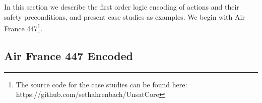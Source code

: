 
In this section we describe the first order logic encoding of actions and their safety preconditions, and present case studies as examples. We begin with Air France 447\footnote{The source code for the case studies can be found here: https://github.com/sethahrenbach/UnsatCore}.

\subsection{Air France 447 Encoded}

